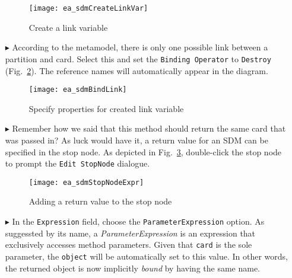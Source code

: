 \begin{itemize}
\begin{figure}[htpb]
\begin{center}
  \texttt{[image: ea\_sdmCreateLinkVar]}
  \caption{Create a link variable}   
  \label{ea:link_variable}
\end{center}
\end{figure}

\item[$\blacktriangleright$] According to the metamodel, there is only one possible link between a partition and card. Select this and set the
\texttt{Binding Operator} to \texttt{Destroy} (Fig.~\ref{ea:link_variable_properties}). The reference names will automatically appear in the diagram.

\vspace{0.5cm}

\begin{figure}[h!]
\begin{center} 
 \texttt{[image: ea\_sdmBindLink]}
  \caption{Specify properties for created link variable}  
  \label{ea:link_variable_properties}
\end{center}
\end{figure}

\vspace{0.5cm}

\item[$\blacktriangleright$] Remember how we said that this method should return the same card that was passed in? As luck would have it, a return value for an
SDM can be specified in the stop node. As depicted in Fig.~\ref{ea:stop_node_return_value}, double-click the stop node to prompt the \texttt{Edit StopNode}
dialogue.

\newpage

\begin{figure}[htbp]
\begin{center}
  \texttt{[image: ea\_sdmStopNodeExpr]}
  \caption{Adding a return value to the stop node}  
  \label{ea:stop_node_return_value}
\end{center}
\end{figure}

\item[$\blacktriangleright$] In the \texttt{Expression} field, choose the \texttt{ParameterExpression} option.
As suggessted by its name, a \emph{ParameterExpression} is an expression that exclusively accesses method parameters. Given that \texttt{card} is the sole
parameter, the \texttt{object} will be automatically set to this value. In other words, the returned object is now implicitly \emph{bound} by having the same
name.


\end{itemize}
